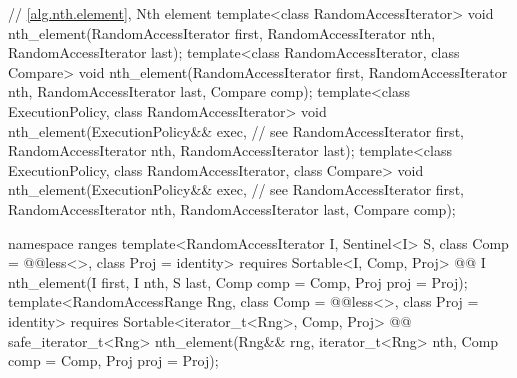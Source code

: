 \begin{codeblock}
  // \ref{alg.nth.element}, Nth element
  template<class RandomAccessIterator>
    void nth_element(RandomAccessIterator first, RandomAccessIterator nth,
                     RandomAccessIterator last);
  template<class RandomAccessIterator, class Compare>
    void nth_element(RandomAccessIterator first, RandomAccessIterator nth,
                     RandomAccessIterator last, Compare comp);
  template<class ExecutionPolicy, class RandomAccessIterator>
    void nth_element(ExecutionPolicy&& exec, // see 
                     RandomAccessIterator first, RandomAccessIterator nth,
                     RandomAccessIterator last);
  template<class ExecutionPolicy, class RandomAccessIterator, class Compare>
    void nth_element(ExecutionPolicy&& exec, // see 
                     RandomAccessIterator first, RandomAccessIterator nth,
                     RandomAccessIterator last, Compare comp);
\end{codeblock}\begin{addedblock}\begin{codeblock}
  namespace ranges {
    template<RandomAccessIterator I, Sentinel<I> S, class Comp = @@less<>,
        class Proj = identity>
      requires Sortable<I, Comp, Proj>
      @@ I
        nth_element(I first, I nth, S last, Comp comp = Comp{}, Proj proj = Proj{});
    template<RandomAccessRange Rng, class Comp = @@less<>, class Proj = identity>
      requires Sortable<iterator_t<Rng>, Comp, Proj>
      @@ safe_iterator_t<Rng>
        nth_element(Rng&& rng, iterator_t<Rng> nth, Comp comp = Comp{}, Proj proj = Proj{});
  }
\end{codeblock}\end{addedblock}\begin{codeblock}


\end{codeblock}
